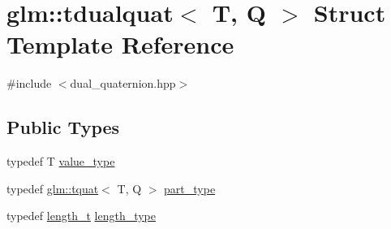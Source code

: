 \hypertarget{structglm_1_1tdualquat}{}\section{glm\+:\+:tdualquat$<$ T, Q $>$ Struct Template Reference}
\label{structglm_1_1tdualquat}


{\ttfamily \#include $<$dual\+\_\+quaternion.\+hpp$>$}

\subsection*{Public Types}
\begin{DoxyCompactItemize}
\item 
typedef T \mbox{\hyperlink{structglm_1_1tdualquat_ab9028885c8de069ef8a61ebab77f7ccc}{value\+\_\+type}}
\item 
typedef \mbox{\hyperlink{structglm_1_1tquat}{glm\+::tquat}}$<$ T, Q $>$ \mbox{\hyperlink{structglm_1_1tdualquat_ab18b8665bbd568f9bc93ef93ed475a47}{part\+\_\+type}}
\item 
typedef \mbox{\hyperlink{namespaceglm_a090a0de2260835bee80e71a702492ed9}{length\+\_\+t}} \mbox{\hyperlink{structglm_1_1tdualquat_ad9fa4fd7f84d17bebd3efed6b5455d80}{length\+\_\+type}}
\end{DoxyCompactItemize}
